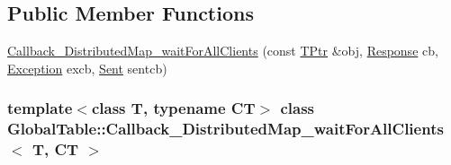 \subsection*{Public Member Functions}
\begin{DoxyCompactItemize}
\item 
\hyperlink{class_global_table_1_1_callback___distributed_map__wait_for_all_clients_ad06f4d3bc88d4e734d28b6334a587f96}{Callback\_\-DistributedMap\_\-waitForAllClients} (const \hyperlink{class_global_table_1_1_callback___distributed_map__wait_for_all_clients_a0efb2e7297b9ccbba6e37fb4ce9a201e}{TPtr} \&obj, \hyperlink{class_global_table_1_1_callback___distributed_map__wait_for_all_clients_aba88f013404c18506ba6ad7bb0bf26bc}{Response} cb, \hyperlink{class_global_table_1_1_callback___distributed_map__wait_for_all_clients_a1e030c06ca5740affedcffb34ba857fc}{Exception} excb, \hyperlink{class_global_table_1_1_callback___distributed_map__wait_for_all_clients_ae931e7cc8794e1f268b0cc30db99f3d6}{Sent} sentcb)
\end{DoxyCompactItemize}
\subsubsection*{template$<$class T, typename CT$>$ class GlobalTable::Callback\_\-DistributedMap\_\-waitForAllClients$<$ T, CT $>$}



